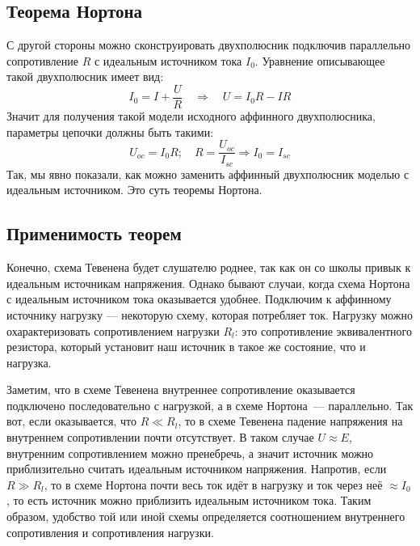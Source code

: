 \documentclass[11pt,a4paper]{article}
\begin{document}
\subsection*{Теорема Нортона}
С другой стороны можно сконструировать двухполюсник подключив параллельно сопротивление $R$ с идеальным источником тока $I_0$. Уравнение описывающее такой двухполюсник имеет вид:
$$
I_0 = I + \frac{U}{R} \quad \Rightarrow \quad U = I_0R - IR
$$
Значит для получения такой модели исходного аффинного двухполюсника, параметры цепочки должны быть такими:
$$
U_{oc} = I_0R; \quad R = \frac{U_{oc}}{I_{sc}} \Rightarrow I_0 = I_{sc}
$$
Так, мы явно показали, как можно заменить аффинный двухполюсник моделью с идеальным источником. Это суть теоремы Нортона.

\subsection*{Применимость теорем}

Конечно, схема Тевенена будет слушателю роднее, так как он со школы
привык к идеальным источникам напряжения. Однако бывают случаи, когда
схема Нортона с идеальным источником тока оказывается удобнее. Подключим
к аффинному источнику нагрузку --- некоторую схему, которая потребляет
ток. Нагрузку можно охарактеризовать сопротивлением нагрузки $R_l$: это
сопротивление эквивалентного резистора, который установит наш источник в
такое же состояние, что и нагрузка.

Заметим, что в схеме Тевенена внутреннее сопротивление оказывается
подключено последовательно с нагрузкой, а в схеме Нортона~--- параллельно.
Так вот, если оказывается, что $R \ll R_l$, то в схеме Тевенена падение
напряжения на внутреннем сопротивлении почти отсутствует. В таком случае
$U \approx E$, внутренним сопротивлением можно пренебречь, а значит
источник можно приблизительно считать идеальным источником напряжения.
Напротив, если $R \gg R_l$, то в схеме Нортона почти весь ток идёт в
нагрузку и ток через неё $\approx I_0$, то есть источник можно приблизить
идеальным источником тока. Таким образом, удобство той или иной схемы
определяется соотношением внутреннего сопротивления и сопротивления
нагрузки.
\end{document}
